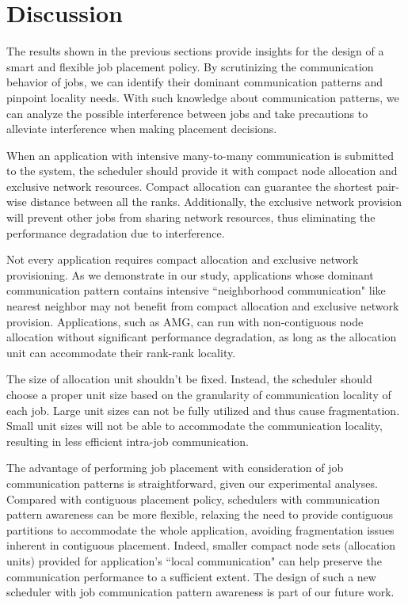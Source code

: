 
\section{Discussion}
\label{sec:discussion}

The results shown in the previous sections provide insights 
for the design of a smart and flexible job placement policy. 
By scrutinizing the communication behavior of jobs, 
we can identify their dominant communication patterns 
and pinpoint locality needs. 
With such knowledge about communication patterns, 
we can analyze the possible interference between jobs and 
take precautions to alleviate interference when making placement decisions. 

When an application with intensive many-to-many communication is submitted to the system, 
the scheduler should provide it with compact node allocation and exclusive network resources. 
Compact allocation can guarantee the shortest pair-wise distance between all the ranks. 
Additionally, the exclusive network provision will prevent other jobs from sharing network resources, 
thus eliminating the performance degradation due to interference.

Not every application requires compact allocation and exclusive network provisioning. 
As we demonstrate in our study, 
applications whose dominant communication pattern contains intensive 
``neighborhood communication" like nearest neighbor may not benefit 
from compact allocation and exclusive network provision. 
Applications, such as AMG, can run with non-contiguous node 
allocation without significant performance degradation, 
as long as the allocation unit can accommodate their rank-rank locality.

The size of allocation unit shouldn't be fixed. 
Instead, the scheduler should choose a proper unit size 
based on the granularity of communication locality of each job.   
Large unit sizes can not be fully utilized and thus cause fragmentation. 
Small unit sizes will not be able to accommodate the communication locality, 
resulting in less efficient intra-job communication.


The advantage of performing job placement with consideration 
of job communication patterns is straightforward,
given our experimental analyses. 
Compared with contiguous placement policy, 
schedulers with communication pattern awareness can be more flexible, 
relaxing the need to provide contiguous partitions to accommodate the whole application,
avoiding fragmentation issues inherent in contiguous placement.
Indeed, smaller compact node sets (allocation units) provided for application's
``local communication" can help preserve the communication performance to a sufficient extent. 
The design of such a new scheduler with job communication pattern awareness 
is part of our future work. 



